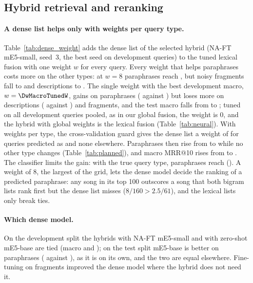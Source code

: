 \documentclass[11pt]{article}
\makeatletter
\newcommand{\mrr}{MRR@10\xspace}
\makeatother
\begin{document}
\subsection{Hybrid retrieval and reranking}\label{sec:res_hybrid}



\paragraph{A dense list helps only with weights per query type.} Table~\ref{tab:dense_weight} adds the dense
list of the selected hybrid (NA-FT mE5-small, seed~3, the best seed on development queries) to the tuned
lexical fusion with one weight $w$ for every query. Every weight that helps paraphrases costs more on the
other types: at $w=8$ paraphrases reach \DwEightFour, but noisy fragments fall to \DwEightThree{} and
descriptions to \DwEightFive. The single weight with the best development macro, $w=\DwMacroTunedW$, gains on
paraphrases (\DwQuarterFour{} against \DwZeroFour) but loses more on descriptions (\DwQuarterFive{} against
\DwZeroFive) and fragments, and the test macro falls from \DwZeroMacro{} to \DwQuarterMacro; tuned on all
development queries pooled, as in our global fusion, the weight is 0, and the hybrid with global weights is
the lexical fusion (Table~\ref{tab:neural}). With weights per type, the cross-validation guard gives the dense
list a weight of \DwAdaptiveWeight{} for queries predicted as \DwAdaptiveTypes{} and none elsewhere.
Paraphrases then rise from \PlHybridFourA{} to \PlHybridFourB{} while no other type changes
(Table~\ref{tab:planned}), and macro \mrr{} rises from \MFuseGlobalMacro{} to \MHybNaftAdaptiveMacro. The
classifier limits the gain: with the true query type, paraphrases reach \PlOracleFourB{} (\PlOracleFour). A
weight of 8, the largest of the grid, lets the dense model decide the ranking of a predicted paraphrase:
any song in its top 100 outscores a song that both bigram lists rank first but the dense list misses
($8/160 > 2.5/61$), and the lexical lists only break ties.

\paragraph{Which dense model.} On the development split the hybrids with NA-FT mE5-small and with zero-shot
mE5-base are tied (macro \MHybNaftAdaptiveDev{} and \MHybEbaseAdaptiveDev); on the test split mE5-base is
better on paraphrases (\PlOtherdenseFourB{} against \PlOtherdenseFourA), as it is on its own, and the two
are equal elsewhere. Fine-tuning on fragments improved the dense model where the hybrid does not need it.
\end{document}
